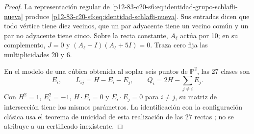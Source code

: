 \begin{proof}
La representación regular de
\cref{p12-83-c20-s6:eq:identidad-grupo-schlafli-nueva} produce
\cref{p12-83-c20-s6:eq:identidad-schlafli-nueva}. Sus entradas dicen que todo vértice
tiene diez vecinos, que un par adyacente tiene un vecino común y un par no
adyacente tiene cinco. Sobre la recta constante, \(A_\ell\) actúa por 10;
en su complemento, \(J=0\) y
\((A_\ell-I)(A_\ell+5I)=0\). Traza cero fija las multiplicidades 20 y 6.

En el modelo de una cúbica obtenida al soplar seis puntos de
\(\mathbb P^2\), las 27 clases son
\[
 E_i,\qquad L_{ij}=H-E_i-E_j,\qquad
 Q_i=2H-\sum_{j\ne i}E_j.
\]
Con \(H^2=1\), \(E_i^2=-1\), \(H\cdot E_i=0\) y
\(E_i\cdot E_j=0\) para \(i\ne j\), su matriz de intersección tiene los
mismos parámetros. La identificación con la configuración clásica usa el
teorema de unicidad de esta realización de las 27 rectas
\cite{Manivel2005}; no se atribuye a un certificado inexistente.
\end{proof}

